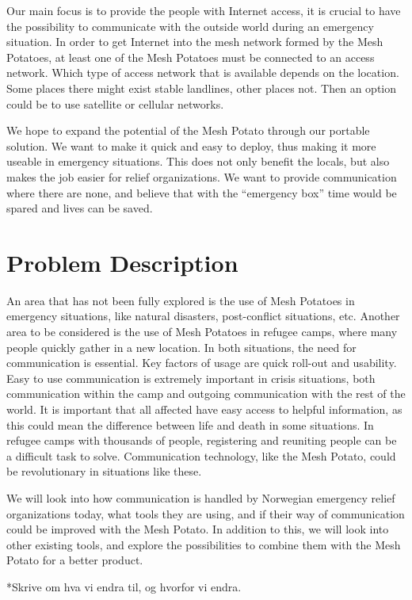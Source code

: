 Our main focus is to provide the people with Internet access, it is crucial to have the possibility to communicate with the outside world during an emergency situation. In order to get Internet into the mesh network formed by the Mesh Potatoes, at least one of the Mesh Potatoes must be connected to an access network. Which type of access network that is available depends on the location. Some places there might exist stable landlines, other places not. Then an option could be to use satellite or cellular networks. 

We hope to expand the potential of the Mesh Potato through our portable solution. We want to make it quick and easy to deploy, thus making it more useable in emergency situations. This does not only benefit the locals, but also makes the job easier for relief organizations. 
We want to provide communication where there are none,  and believe that with the “emergency box” time would be spared and lives can be saved.

\section{Problem Description}
An area that has not been fully explored is the use of Mesh Potatoes in emergency situations, like natural disasters, post-conflict situations, etc. Another area to be considered is the use of Mesh Potatoes in refugee camps, where many people quickly gather in a new location. In both situations, the need for communication is essential. Key factors of usage are quick roll-out and usability. Easy to use communication is extremely important in crisis situations, both communication within the camp and outgoing communication with the rest of the world. It is important that all affected have easy access to helpful information, as this could mean the difference between life and death in some situations. In refugee camps with thousands of people, registering and reuniting people can be a difficult task to solve. Communication technology, like the Mesh Potato, could be revolutionary in situations like these. 

We will look into how communication is handled by Norwegian emergency relief organizations today, what tools they are using, and if their way of communication could be improved with the Mesh Potato. In addition to this, we will look into other existing tools, and explore the possibilities to combine them with the Mesh Potato for a better product. 


*Skrive om hva vi endra til, og hvorfor vi endra. 


